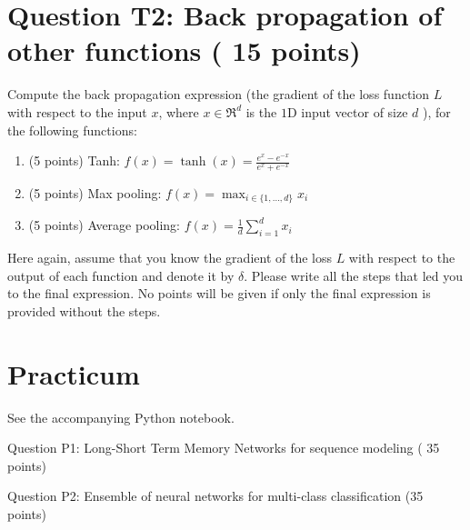 \documentclass[10pt]{article}
\begin{document}
\section{Question T2: Back propagation of other functions ( 15 points)}
Compute the back propagation expression (the gradient of the loss function $L$ with respect to the input $x$, where $x \in \Re^{d}$ is the $1 \mathrm{D}$ input vector of size $d$ ), for the following functions:

\begin{enumerate}
  \item (5 points) Tanh: $f(x)=\tanh (x)=\frac{e^{x}-e^{-x}}{e^{x}+e^{-x}}$

  \item (5 points) Max pooling: $f(x)=\max _{i \in\{1, \ldots, d\}} x_{i}$

  \item (5 points) Average pooling: $f(x)=\frac{1}{d} \sum_{i=1}^{d} x_{i}$

\end{enumerate}
Here again, assume that you know the gradient of the loss $L$ with respect to the output of each function and denote it by $\delta$. Please write all the steps that led you to the final expression. No points will be given if only the final expression is provided without the steps.

\section{Practicum}
See the accompanying Python notebook.

Question P1: Long-Short Term Memory Networks for sequence modeling ( 35 points)

Question P2: Ensemble of neural networks for multi-class classification (35 points)
\end{document}
